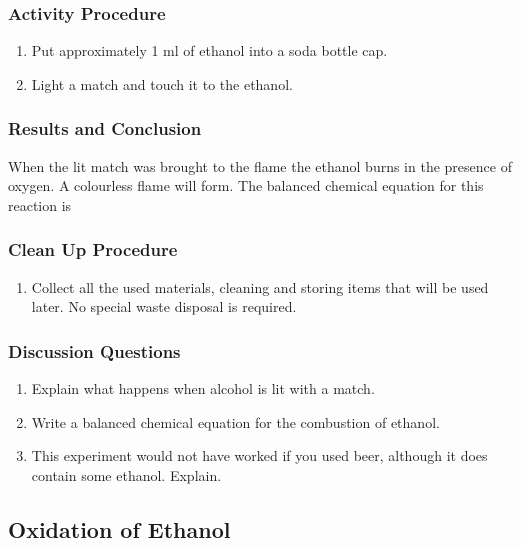 \subsubsection*{Activity Procedure}
\begin{enumerate}
\item{Put approximately 1 ml of ethanol into a soda bottle cap.}
\item{Light a match and touch it to the ethanol.}
\end{enumerate}

\subsubsection*{Results and Conclusion}
When the lit match was brought to the flame the ethanol burns in the presence of oxygen. A colourless flame will form. The balanced chemical equation for this reaction is
\begin{center}
\end{center}

\subsubsection*{Clean Up Procedure}
\begin{enumerate}
\item{Collect all the used materials, cleaning and storing items that will be used later. No special waste disposal is required.}
\end{enumerate}

\subsubsection*{Discussion Questions}
\begin{enumerate}
\item{Explain what happens when alcohol is lit with a match.}
\item{Write a balanced chemical equation for the combustion of ethanol.}
\item{This experiment would not have worked if you used beer, although it does contain some ethanol. Explain.}
\end{enumerate}

\subsection{Oxidation of Ethanol}

